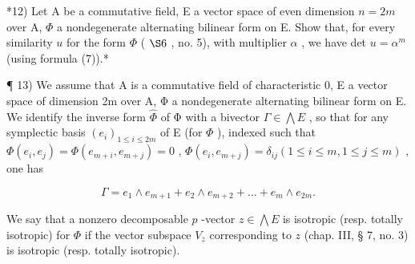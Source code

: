 *12) Let A be a commutative field, E a vector space of even dimension \(n=2m\) over A, \(\Phi\) a nondegenerate alternating bilinear form on E. Show that, for every similarity \(u\) for the form \(\Phi\) ( \(\S 6\) , no. 5), with multiplier \(\alpha\) , we have det \(u=\alpha^{m}\) (using formula (7)).*

¶ 13) We assume that A is a commutative field of characteristic 0, E a vector space of dimension 2m over A, Φ a nondegenerate alternating bilinear form on E. We identify the inverse form \(\widehat{\Phi}\) of Φ with a bivector \(\Gamma\in\bigwedge E\) , so that for any symplectic basis \((e_{i})_{1\leqslant i\leqslant2m}\) of E (for \(\Phi\) ), indexed such that \(\Phi(e_{i},e_{j})=\Phi(e_{m+i},e_{m+j})=0\) , \(\Phi(e_{i},e_{m+j})=\delta_{ij}(1\leqslant i\leqslant m,1\leqslant j\leqslant m)\) , one has

\[
\Gamma = e _ {1} \wedge e _ {m + 1} + e _ {2} \wedge e _ {m + 2} + \dots + e _ {m} \wedge e _ {2 m}.
\]

We say that a nonzero decomposable \(p\) -vector \(z \in \bigwedge E\) is isotropic (resp. totally isotropic) for \(\Phi\) if the vector subspace \(V_z\) corresponding to \(z\) (chap. III, § 7, no. 3) is isotropic (resp. totally isotropic).

